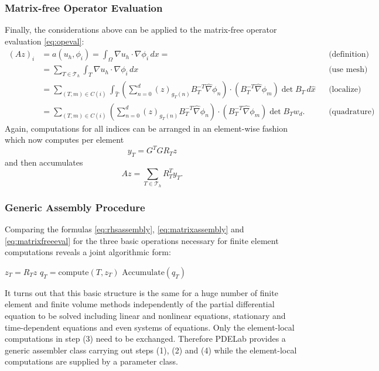 \documentclass[a4paper,12pt]{article}
\begin{document}
\subsubsection*{Matrix-free Operator Evaluation}

Finally, the considerations above can be applied to the matrix-free operator
evaluation \eqref{eq:opeval}:
\begin{align*}
(Az)_i  &= a(u_h,\phi_i) =  \int_\Omega \nabla u_h \cdot \nabla \phi_i \,dx =
&&\text{(definition)} \\ 
&= \sum_{T\in\mathcal{T}_h} \int_T \nabla u_h \cdot \nabla \phi_i \,dx
&&\text{(use mesh)}\\
&= \sum_{(T,m)\in C(i)}
\int_{\hat T} 
\left(\sum_{n=0}^d (z)_{g_T(n)} B_T^{-T} \hat\nabla\phi_n\right)
\cdot (B_T^{-T} \hat\nabla\phi_m) \det B_T \,d\hat x &&\text{(localize)}\\
&= \sum_{(T,m)\in C(i)}
\left(\sum_{n=0}^d (z)_{g_T(n)} B_T^{-T} \hat\nabla\phi_n\right)
\cdot (B_T^{-T} \hat\nabla\phi_m) \det B_T w_d . &&\text{(quadrature)}
\end{align*}
Again, computations for all indices can be arranged in an element-wise fashion
which now computes per element
\begin{equation}
y_T = G^T G R_T z
\label{eq:alpha_volume}
\end{equation}
and then accumulates
\begin{equation}
Az =  \sum_{T\in\mathcal{T}_h} R_T^T y_T.
\label{eq:matrixfreeeval}
\end{equation}

\subsubsection*{Generic Assembly Procedure}

Comparing the formulas \eqref{eq:rhsassembly}, \eqref{eq:matrixassembly}
and \eqref{eq:matrixfreeeval} for the three basic operations necessary for
finite element computations reveals a joint algorithmic form:
\begin{algorithmic}[1]
 
\State $z_T = R_T z$ 
\State $q_T=\text{compute}(T,z_T)$ 
\State $\text{Accumulate}(q_T)$ 
\EndFor
\end{algorithmic}

It turns out that this basic structure is the same for a huge number
of  finite element and finite volume methods independently of
the partial differential equation to be solved including linear
and nonlinear equations, stationary and time-dependent equations
and even systems of equations. Only the element-local
computations in step (3) need to be exchanged. Therefore PDELab
provides a generic assembler class carrying out steps (1), (2) and (4)
while the element-local computations are supplied by a parameter class.
\end{document}
